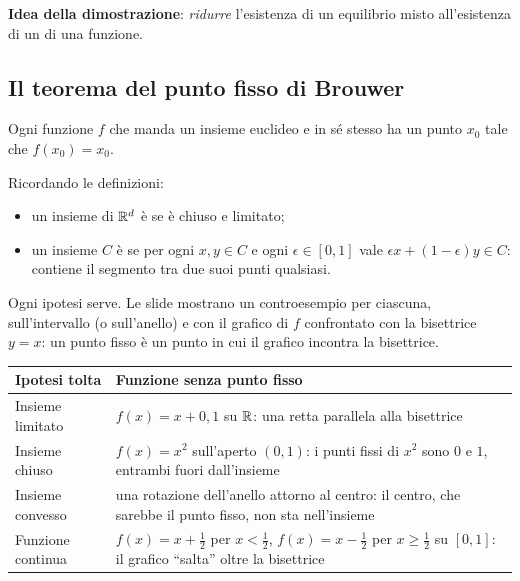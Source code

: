 \textbf{Idea della dimostrazione}: \emph{ridurre} l'esistenza di un equilibrio misto
all'esistenza di un  di una funzione.

\subsection{Il teorema del punto fisso di Brouwer}

\begin{teorema}[Brouwer, 1911]
Ogni funzione  $f$ che manda un insieme euclideo  e 
in sé stesso ha un punto $x_0$ tale che $f(x_0) = x_0$.
\end{teorema}

Ricordando le definizioni:
\begin{itemize}
  \item un insieme di $\mathbb{R}^d$ è  se è chiuso e limitato;
  \item un insieme $C$ è  se per ogni $x, y \in C$ e ogni
        $\epsilon \in [0,1]$ vale $\epsilon x + (1-\epsilon)y \in C$: contiene il segmento tra
        due suoi punti qualsiasi.
\end{itemize}

Ogni ipotesi serve. Le slide mostrano un controesempio per ciascuna, sull'intervallo
(o sull'anello) e con il grafico di $f$ confrontato con la bisettrice $y = x$: un punto fisso
è un punto in cui il grafico incontra la bisettrice.

\begin{center}
\renewcommand{\arraystretch}{1.3}
\begin{tabularx}{\linewidth}{@{}l X@{}}
\toprule
Ipotesi tolta & Funzione senza punto fisso \\
\midrule
Insieme limitato & $f(x) = x + 0{,}1$ su $\mathbb{R}$: una retta parallela alla bisettrice \\
Insieme chiuso & $f(x) = x^2$ sull'aperto $(0,1)$: i punti fissi di $x^2$ sono $0$ e $1$,
 entrambi fuori dall'insieme \\
Insieme convesso & una rotazione dell'anello attorno al centro: il centro, che sarebbe il punto
fisso, non sta nell'insieme \\
Funzione continua & $f(x) = x + \tfrac12$ per $x < \tfrac12$, $f(x) = x - \tfrac12$ per
 $x \ge \tfrac12$ su $[0,1]$: il grafico ``salta'' oltre la bisettrice \\
\bottomrule
\end{tabularx}
\end{center}

